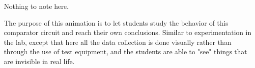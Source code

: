 
Nothing to note here.







The purpose of this animation is to let students study the behavior of this comparator circuit and reach their own conclusions.  Similar to experimentation in the lab, except that here all the data collection is done visually rather than through the use of test equipment, and the students are able to "see" things that are invisible in real life.




